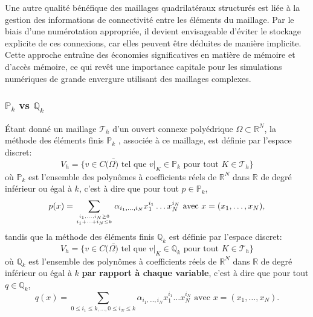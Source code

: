 Une autre qualité bénéfique des maillages quadrilatéraux structurés est liée à la gestion des informations de connectivité entre les éléments du maillage. Par le biais d'une numérotation appropriée, il devient envisageable d'éviter le stockage explicite de ces connexions, car elles peuvent être déduites de manière implicite. Cette approche entraîne des économies significatives en matière de mémoire et d'accès mémoire, ce qui revêt une importance capitale pour les simulations numériques de grande envergure utilisant des maillages complexes.


\subsubsection{$\mathbb{P}_k$ vs $\mathbb{Q}_k$}

\'Etant donné un maillage $\mathcal{T}_h$ d'un ouvert connexe polyédrique $\Omega\subset\mathbb{R}^N$, la méthode des éléments finis $\mathbb{P}_k$ \cite{allaire2005analyse}, associée à ce maillage, est définie par l'espace discret:
$$V_h=\{v\in C(\bar{\Omega)}\text{ tel que }v|_{K}\in\mathbb{P}_k\text{ pour tout }K\in\mathcal{T}_h\}$$
où $\mathbb{P}_k$ est l'ensemble des polynômes à coefficients réels de $\mathbb{R}^N$ dans $\mathbb{R}$ de degré inférieur ou égal à $k$, c'est à dire que pour tout $p\in\mathbb{P}_k$,
$$p(x)=\displaystyle\sum_{i_1,\dots, i_N\geq 0\atop i_1+\dots+i_N\leq k}\alpha_{i_1,\dots,i_N}x_1^{i_1}\dots x_N^{i_N}\text{ avec }x=(x_1,\dots,x_N),$$
tandis que la méthode des éléments finis $\mathbb{Q}_k$ est définie par l'espace discret:
$$V_h=\{v\in C(\bar{\Omega)}\text{ tel que }v|_{K}\in\mathbb{Q}_k\text{ pour tout }K\in\mathcal{T}_h\}$$
où $\mathbb{Q}_k$ est l'ensemble des polynômes à coefficients réels de $\mathbb{R}^N$ dans $\mathbb{R}$ de degré inférieur ou égal à $k$ \textbf{par rapport à chaque variable}, c'est à dire que pour tout $q\in\mathbb{Q}_k$,
$$q(x)=\displaystyle\sum_{0\leq i_1\leq k,\dots,0\leq i_N\leq k}\alpha_{i_1,\dots,i_N}x_1^{i_1}\dots x_N^{i_N}\text{ avec }x=(x_1,\dots,x_N).$$

